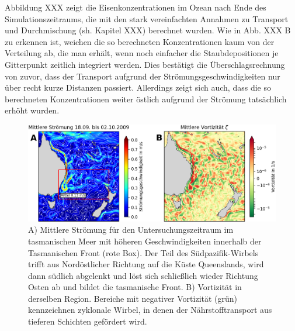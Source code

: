 \documentclass[12pt,a4paper,onecolumn,draft]{scrartcl}
\begin{document}
Abbildung XXX zeigt die Eisenkonzentrationen im Ozean nach Ende des Simulationszeitraums, die mit den stark vereinfachten Annahmen zu Transport und Durchmischung (sh. Kapitel XXX) berechnet wurden. Wie in Abb. XXX B zu erkennen ist, weichen die so berechneten Konzentrationen kaum von der Verteilung ab, die man erhält, wenn noch einfacher die Staubdepositionen je Gitterpunkt zeitlich integriert werden. Dies bestätigt die Überschlagsrechnung von zuvor, dass der Transport aufgrund der Strömungsgeschwindigkeiten nur über recht kurze Distanzen passiert. Allerdings zeigt sich auch, dass die so berechneten Konzentrationen weiter östlich aufgrund der Strömung tatsächlich erhöht wurden.    
\begin{figure}
\includegraphics[width=\textwidth]{bilder/currents_mean.png}
\caption{A) Mittlere Strömung für den Untersuchungszeitraum im tasmanischen Meer mit höheren Geschwindigkeiten innerhalb der Tasmanischen Front (rote Box). Der Teil des Südpazifik-Wirbels trifft aus Nordöstlicher Richtung auf die Küste Queenslands, wird dann südlich abgelenkt und löst sich schließlich wieder Richtung Osten ab und bildet die tasmanische Front. B) Vortizität in derselben Region. Bereiche mit negativer Vortizität (grün) kennzeichnen zyklonale Wirbel, in denen der Nährstofftransport aus tieferen Schichten gefördert wird. } \label{fig:tasman_current}
\end{figure}
\end{document}
